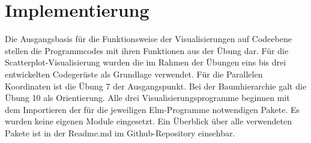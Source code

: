 \documentclass[usegeometry=true]{scrartcl}
\begin{document}
\section{Implementierung}
Die Ausgangsbasis für die Funktionsweise der Visualisierungen auf Codeebene  stellen die Programmcodes mit ihren Funktionen aus der Übung dar. Für die Scatterplot-Visualisierung wurden die im Rahmen der Übungen eins bis drei entwickelten Codegerüste als Grundlage verwendet. Für die Parallelen Koordinaten ist die Übung 7 der Ausgangspunkt. Bei der Baumhierarchie galt die Übung 10 als Orientierung. 
Alle drei Visualisierungsprogramme beginnen mit dem Importieren der für die jeweiligen Elm-Programme notwendigen Pakete. Es wurden keine eigenen Module eingesetzt. Ein Überblick über alle verwendeten Pakete ist in der Readme.md im Github-Repository einsehbar. 
\end{document}
